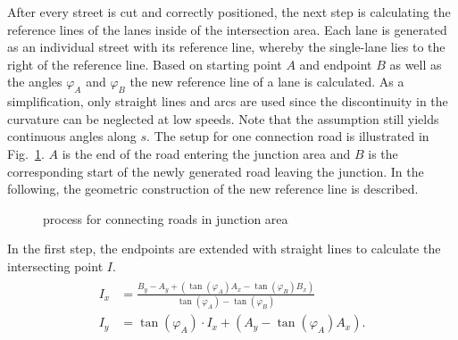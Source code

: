 \documentclass[a4paper, 10pt, conference]{ieeeconf}      %
\begin{document}


    After every street is cut and correctly positioned, the next step is calculating the reference lines of the lanes inside of the intersection area. Each lane is generated as an individual street with its reference line, whereby the single-lane lies to the right of the reference line. Based on starting point \(A\) and endpoint \(B\) as well as the angles \(\varphi_{A}\) and \(\varphi_{B}\) the new reference line of a lane is calculated. As a simplification, only straight lines and arcs are used since the discontinuity in the curvature can be neglected at low speeds. Note that the assumption still yields continuous angles along $s$. The setup for one connection road is illustrated in Fig.~\ref{fig_connecting_road}. $A$ is the end of the road entering the junction area and $B$ is the corresponding start of the newly generated road leaving the junction. In the following, the geometric construction of the new reference line is described.
    \begin{figure}[thpb]
    	
    	\caption{process for connecting roads in junction area}
    	\label{fig_connecting_road}
    \end{figure}

    In the first step, the endpoints are extended with straight lines to calculate the intersecting point \(I\). 
    \begin{align}
        \begin{split}
            I_x &= \frac{B_y - A_y + \left(\tan(\varphi_A) A_x - \tan(\varphi_B) B_x\right)}{\tan(\varphi_A) - \tan(\varphi_B)} \\
            I_y &= \tan(\varphi_A) \cdot I_x + \left(A_y - \tan(\varphi_A) A_x\right) \text{.}
        \end{split}     
    \end{align}
\end{document}
